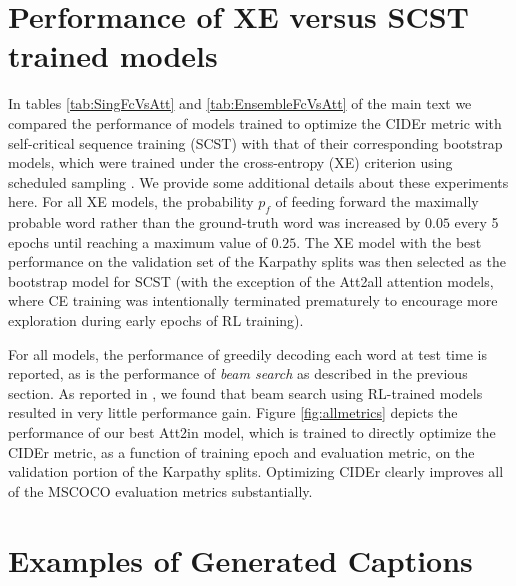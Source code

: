 \documentclass[10pt,twocolumn,letterpaper]{article}
\begin{document}
\section{Performance of XE versus SCST  trained models}

In tables \ref{tab:SingFcVsAtt} and \ref{tab:EnsembleFcVsAtt} of the main text we compared the performance of models trained to optimize the CIDEr metric with self-critical sequence training (SCST) with that of their corresponding bootstrap models, which were trained under the cross-entropy (XE) criterion using scheduled sampling \cite{ScheduledSampling}. We provide some additional details about these experiments here. For all XE models, the probability $p_f$ of feeding forward the maximally probable word rather than the ground-truth word was increased by $0.05$ every 5 epochs until reaching a maximum value of $0.25$. The XE model with the best performance on the validation set of the Karpathy splits was then selected as the bootstrap model for SCST (with the exception of the Att2all attention models, where CE training was intentionally terminated prematurely to encourage more exploration during early epochs of RL training).

For all models, the performance of greedily decoding each word at test time is reported, as is the performance of \emph{beam search} as described in the previous section. As reported in \cite{Ranzato}, we found that beam search using RL-trained models resulted in very little performance gain. Figure \ref{fig:allmetrics} depicts the performance of our best Att2in model, which is trained to directly optimize the CIDEr metric, as a function of training epoch and evaluation metric, on the validation portion of the Karpathy splits. Optimizing CIDEr clearly improves all of the MSCOCO evaluation metrics substantially.

\section{Examples of Generated Captions}
\label{Sec:appExample}
\end{document}
